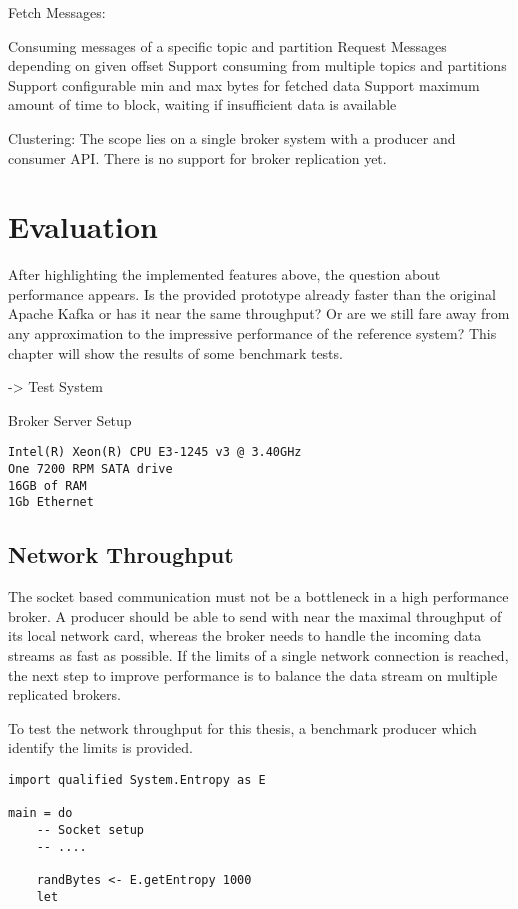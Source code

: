 Fetch Messages: 
\begin{itemize}
        \tick Consuming messages of a specific topic and partition
        \tick Request Messages depending on given offset
        \fail Support consuming from multiple topics and partitions 
        \fail Support configurable min and max bytes for fetched data
        \fail Support maximum amount of time to block, waiting if insufficient
        data is available
\end{itemize}
Clustering: The scope lies on a single broker system with a producer and
consumer API. There is no support for broker replication yet. 

\section{Evaluation}
After highlighting the implemented features above, the question about
performance appears. Is the provided prototype already faster than the original
Apache Kafka or has it near the same throughput? Or are we still fare away from any
approximation to the impressive performance of the reference system? This
chapter will show the results of some benchmark tests.

-> Test System

Broker Server Setup
\begin{verbatim}
Intel(R) Xeon(R) CPU E3-1245 v3 @ 3.40GHz
One 7200 RPM SATA drive
16GB of RAM
1Gb Ethernet 
\end{verbatim}

\subsection{Network Throughput}
The socket based communication must not be a bottleneck in a high performance
broker. A producer should be able to send with near the maximal throughput of
its local network card, whereas the broker needs to handle the incoming data
streams as fast as possible. If the limits of a single network connection is
reached, the next step to improve performance is to balance the data
stream on multiple replicated brokers.

To test the network throughput for this thesis, a benchmark producer
which identify the limits is provided.

\begin{lstlisting}
import qualified System.Entropy as E

main = do 
    -- Socket setup 
    -- ....

    randBytes <- E.getEntropy 1000
    let
\end{lstlisting}


